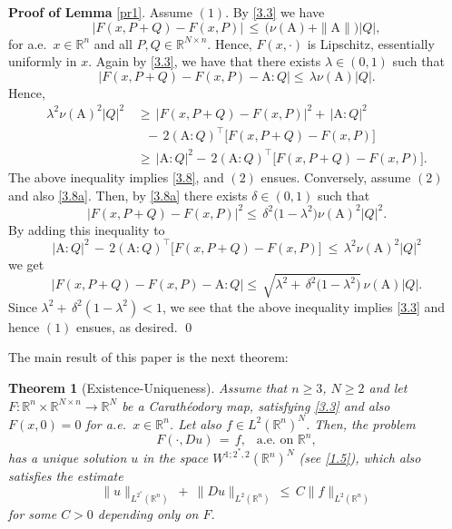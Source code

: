 \documentclass{amsart}
\newtheorem{theorem}{Theorem}
\theoremstyle{definition}
\numberwithin{equation}{section}
\begin{document}
{\medskip \noindent \textbf{Proof of Lemma} } \ref{pr1}. Assume $(1)$. By \eqref{3.3} we have
\[
\big|F(x,P+Q)-F(x,P) \big|\, \leq\, \big(\nu({\textrm{A}}) +\|{\textrm{A}}\|\big)|Q|,
\]
for a.e.\ $x\in {\mathbb{R}}^n$ and all $P,Q\in {\mathbb{R}}^{N{\times} n}$. Hence, $F(x,\cdot)$ is Lipschitz, essentially uniformly in $x$. Again by \eqref{3.3}, we have that there exists ${\lambda} \in (0,1)$ such that
\[
\Big| F(x,P+Q) -F(x,P) -{\textrm{A}}:Q \Big| \leq \, {\lambda} \nu({\textrm{A}})|Q|.
\]
Hence, 
\begin{align}  \nonumber
 {\lambda}^2 \nu({\textrm{A}})^2|Q|^2 \, &\geq \,  \big|F(x,P+Q) -F(x,P) \big|^2+\, | {\textrm{A}}: Q |^2  \nonumber \\
& \ \ \ -\, 2\left( {\textrm{A}}: Q \right)^\top\Big[  F(x,P+Q) -F(x,P) \Big] \nonumber\\
&\geq\, | {\textrm{A}}: Q |^2-\, 2\left( {\textrm{A}}: Q \right)^\top\Big[  F(x,P+Q) -F(x,P) \Big]. \nonumber
\end{align}
The above inequality implies \eqref{3.8}, and $(2)$ ensues.  Conversely, assume $(2)$ and also \eqref{3.8a}. Then, by \eqref{3.8a} there exists ${\delta} \in (0,1)$ such that
\[
\big|F(x,P+Q) -F(x,P) \big|^2 \leq\,  {\delta}^2 \big( 1-{\lambda}^2 \big)\nu({\textrm{A}})^2|Q|^2.
\]
By adding this inequality to 
\[
|{\textrm{A}}:Q|^2\,-\, 2 ({\textrm{A}}:Q)^\top\Big[F(x,P+Q) - F(x,P) \Big]\ \leq  \, {\lambda}^2\nu({\textrm{A}})^2|Q|^2
\]
we get
\[
\Big| F(x,P+Q) -F(x,P) -{\textrm{A}}:Q \Big| \leq \, \sqrt{{\lambda}^2 +\, {\delta}^2 \big(1-{\lambda}^2\big)}\, \nu({\textrm{A}})|Q|.
\]
Since ${\lambda}^2 +\, {\delta}^2 (1-{\lambda}^2)<1$, we see that the above inequality implies \eqref{3.3} and hence $(1)$ ensues, as desired.    \qed

{\medskip}

The main result of this paper is the next theorem:

\begin{theorem}[Existence-Uniqueness] \label{th2} Assume that $n\geq 3$, $N\geq 2$ and let $F : {\mathbb{R}}^n {\times} {\mathbb{R}}^{N {\times} n}{\longrightarrow} {\mathbb{R}}^N$ be a Carath\'eodory map, satisfying \eqref{3.3} and also $F(x,0)=0$ for a.e.\ $x\in {\mathbb{R}}^n$. Let also $f\in L^2({\mathbb{R}}^n)^N$. Then, the problem
\[
F(\cdot,Du)\, =\, f, \ \ \text{ a.e.\ on }{\mathbb{R}}^n,
\]
has a unique solution $u$ in the space $W^{1;2^*\!,2}({\mathbb{R}}^n)^N$ (see \eqref{1.5}), which also satisfies the estimate
\begin{equation} \label{4.1}
\|u\|_{L^{2^*}({\mathbb{R}}^n)}\ + \ \|Du\|_{L^{2}({\mathbb{R}}^n)}\, \leq\, C \|f\|_{L^{2}({\mathbb{R}}^n)}
\end{equation}
for some $C>0$ depending only on $F$. 
\end{theorem}
 
\end{document}
